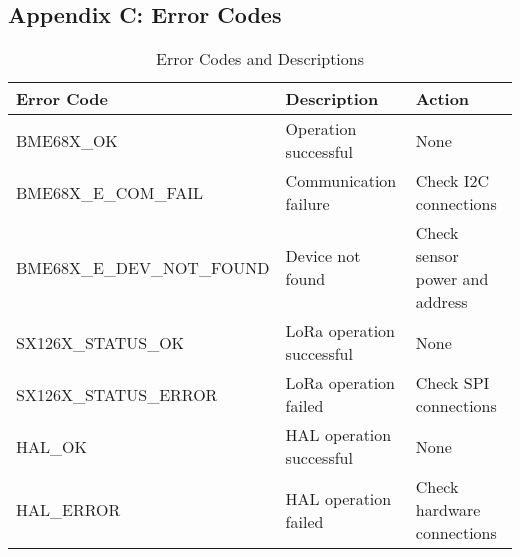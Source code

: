 \documentclass[11pt,a4paper]{article}
\begin{document}
\subsection{Appendix C: Error Codes}
\begin{table}[h]
\centering
\begin{tabular}{|l|l|l|}
\hline
\textbf{Error Code} & \textbf{Description} & \textbf{Action} \\
\hline
BME68X\_OK & Operation successful & None \\
\hline
BME68X\_E\_COM\_FAIL & Communication failure & Check I2C connections \\
\hline
BME68X\_E\_DEV\_NOT\_FOUND & Device not found & Check sensor power and address \\
\hline
SX126X\_STATUS\_OK & LoRa operation successful & None \\
\hline
SX126X\_STATUS\_ERROR & LoRa operation failed & Check SPI connections \\
\hline
HAL\_OK & HAL operation successful & None \\
\hline
HAL\_ERROR & HAL operation failed & Check hardware connections \\
\hline
\end{tabular}
\caption{Error Codes and Descriptions}
\end{table}
\end{document}
